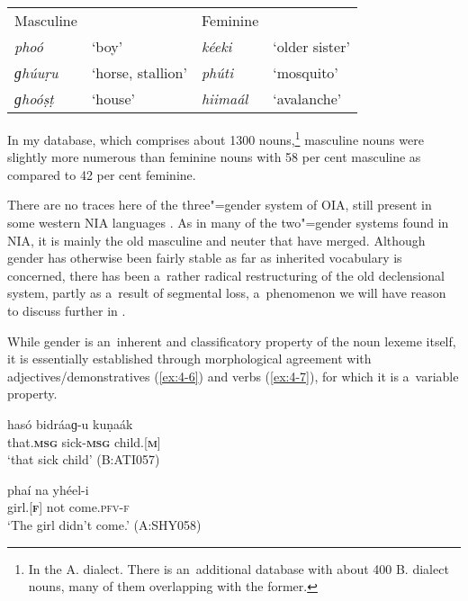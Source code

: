 \begin{table}[H]
\begin{tabularx}{\textwidth}{ Q Q Q Q }
Masculine &
&
Feminine &
\\
\textit{phoó} &
`boy' &
\textit{kéeki} &
`older sister'\\
\textit{ɡhúuṛu} &
`horse, stallion' &
\textit{phúti} &
`mosquito'\\
\textit{ɡhoóṣṭ} &
`house' &
\textit{hiimaál} &
`avalanche'\\
\end{tabularx}
\end{table}

In my database, which comprises about 1300 nouns,\footnote{In the A. dialect. There is an~additional database with about 400 B. dialect nouns, many of them overlapping with the former.} masculine nouns were slightly more numerous than feminine nouns with 58 per cent masculine as compared to 42 per cent feminine.


There are no traces here of the three"=gender system of OIA, still present in some western NIA languages \citep[220--221]{masica1991}. As in many of the two"=gender systems found in NIA, it is mainly the old masculine and neuter that have merged. Although gender has otherwise been fairly stable as far as inherited vocabulary is concerned, there has been a~rather radical restructuring of the old declensional system, partly as a~result of segmental loss, a~phenomenon we will have reason to discuss further in .


While gender is an~inherent and classificatory property of the noun lexeme itself, it is essentially established through morphological agreement with adjectives/demonstratives (\ref{ex:4-6}) and verbs (\ref{ex:4-7}), for which it is a~variable property. 


\begin{exe}
\ex
\label{ex:4-6}
\gll hasó bidráaɡ-u kuṇaák \\
	that.\textbf{\textsc{msg}} sick-\textbf{\textsc{msg}} child.[\textbf{\textsc{m}}] \\
\glt `that sick child' (B:ATI057)
\end{exe}

\begin{exe}
\ex
\label{ex:4-7}
\gll phaí na yhéel-i \\
	girl.[\textbf{\textsc{f}}] not come.\textsc{pfv-\textsc{f}} \\
\glt `The girl didn't come.' (A:SHY058)
\end{exe}

